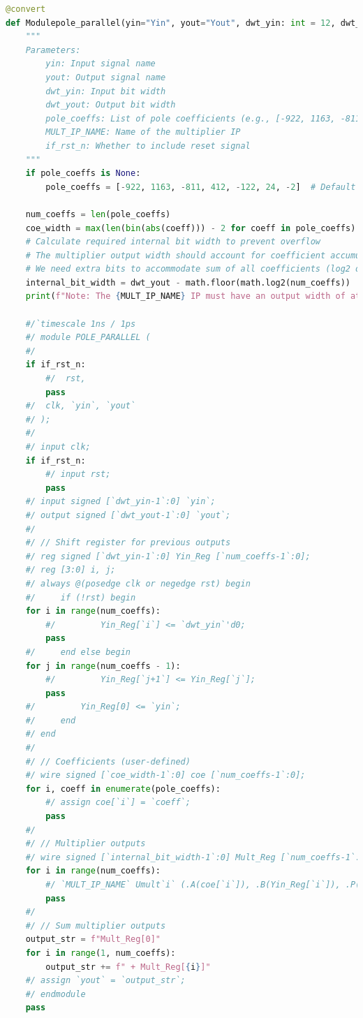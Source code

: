 \begin{lstlisting}[language=python,caption = {IIR滤波器的参数化设计}]
@convert
def Modulepole_parallel(yin="Yin", yout="Yout", dwt_yin: int = 12, dwt_yout: int = 26, pole_coeffs=None, MULT_IP_NAME="MULT", if_rst_n=True):
    """
    Parameters:
        yin: Input signal name
        yout: Output signal name
        dwt_yin: Input bit width
        dwt_yout: Output bit width
        pole_coeffs: List of pole coefficients (e.g., [-922, 1163, -811, 412, -122, 24, -2])
        MULT_IP_NAME: Name of the multiplier IP
        if_rst_n: Whether to include reset signal
    """
    if pole_coeffs is None:
        pole_coeffs = [-922, 1163, -811, 412, -122, 24, -2]  # Default coefficients (Decimal)

    num_coeffs = len(pole_coeffs)
    coe_width = max(len(bin(abs(coeff))) - 2 for coeff in pole_coeffs)  # +1 for the sign
    # Calculate required internal bit width to prevent overflow
    # The multiplier output width should account for coefficient accumulation
    # We need extra bits to accommodate sum of all coefficients (log2 of the number of terms)
    internal_bit_width = dwt_yout - math.floor(math.log2(num_coeffs))
    print(f"Note: The {MULT_IP_NAME} IP must have an output width of at least {internal_bit_width} bits to prevent adder overflow")
    
    #/`timescale 1ns / 1ps
    #/ module POLE_PARALLEL (
    #/ 
    if if_rst_n:
        #/  rst,
        pass
    #/  clk, `yin`, `yout`
    #/ );
    #/ 
    #/ input clk;
    if if_rst_n:
        #/ input rst;
        pass
    #/ input signed [`dwt_yin-1`:0] `yin`;
    #/ output signed [`dwt_yout-1`:0] `yout`;
    #/ 
    #/ // Shift register for previous outputs
    #/ reg signed [`dwt_yin-1`:0] Yin_Reg [`num_coeffs-1`:0];
    #/ reg [3:0] i, j;
    #/ always @(posedge clk or negedge rst) begin
    #/     if (!rst) begin
    for i in range(num_coeffs):
        #/         Yin_Reg[`i`] <= `dwt_yin`'d0;
        pass
    #/     end else begin
    for j in range(num_coeffs - 1):
        #/         Yin_Reg[`j+1`] <= Yin_Reg[`j`];
        pass
    #/         Yin_Reg[0] <= `yin`;
    #/     end
    #/ end
    #/ 
    #/ // Coefficients (user-defined)
    #/ wire signed [`coe_width-1`:0] coe [`num_coeffs-1`:0];
    for i, coeff in enumerate(pole_coeffs):
        #/ assign coe[`i`] = `coeff`;
        pass
    #/ 
    #/ // Multiplier outputs
    #/ wire signed [`internal_bit_width-1`:0] Mult_Reg [`num_coeffs-1`:0];
    for i in range(num_coeffs):
        #/ `MULT_IP_NAME` Umult`i` (.A(coe[`i`]), .B(Yin_Reg[`i`]), .P(Mult_Reg[`i`]));
        pass
    #/ 
    #/ // Sum multiplier outputs
    output_str = f"Mult_Reg[0]"
    for i in range(1, num_coeffs):
        output_str += f" + Mult_Reg[{i}]"
    #/ assign `yout` = `output_str`;
    #/ endmodule
    pass
\end{lstlisting}

